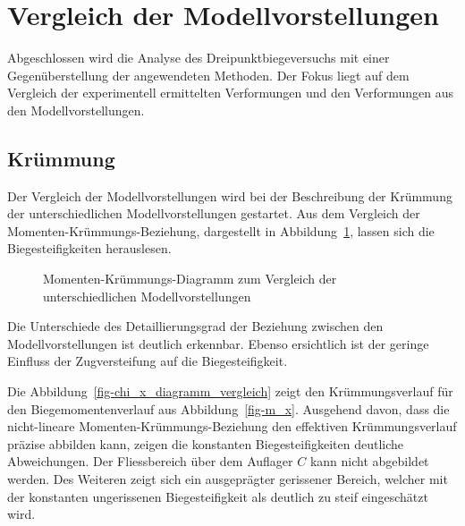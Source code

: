 \documentclass[
  12pt,
  letterpaper,
  egregdoesnotlikesansseriftitles]{scrreprt}
\begin{document}
\section{Vergleich der
Modellvorstellungen}\label{vergleich-der-modellvorstellungen}

Abgeschlossen wird die Analyse des Dreipunktbiegeversuchs mit einer
Gegenüberstellung der angewendeten Methoden. Der Fokus liegt auf dem
Vergleich der experimentell ermittelten Verformungen und den
Verformungen aus den Modellvorstellungen.

\subsection{Krümmung}\label{kruxfcmmung}

Der Vergleich der Modellvorstellungen wird bei der Beschreibung der
Krümmung der unterschiedlichen Modellvorstellungen gestartet. Aus dem
Vergleich der Momenten-Krümmungs-Beziehung, dargestellt in
Abbildung~\ref{fig-mchi_diagramm_vergleich}, lassen sich die
Biegesteifigkeiten herauslesen.

\begin{figure}[H]


\caption{\label{fig-mchi_diagramm_vergleich}Momenten-Krümmungs-Diagramm
zum Vergleich der unterschiedlichen Modellvorstellungen}

\end{figure}%

Die Unterschiede des Detaillierungsgrad der Beziehung zwischen den
Modellvorstellungen ist deutlich erkennbar. Ebenso ersichtlich ist der
geringe Einfluss der Zugversteifung auf die Biegesteifigkeit.

Die Abbildung~\ref{fig-chi_x_diagramm_vergleich} zeigt den
Krümmungsverlauf für den Biegemomentenverlauf aus
Abbildung~\ref{fig-m_x}. Ausgehend davon, dass die nicht-lineare
Momenten-Krümmungs-Beziehung den effektiven Krümmungsverlauf präzise
abbilden kann, zeigen die konstanten Biegesteifigkeiten deutliche
Abweichungen. Der Fliessbereich über dem Auflager \(C\) kann nicht
abgebildet werden. Des Weiteren zeigt sich ein ausgeprägter gerissener
Bereich, welcher mit der konstanten ungerissenen Biegesteifigkeit als
deutlich zu steif eingeschätzt wird.
\end{document}
